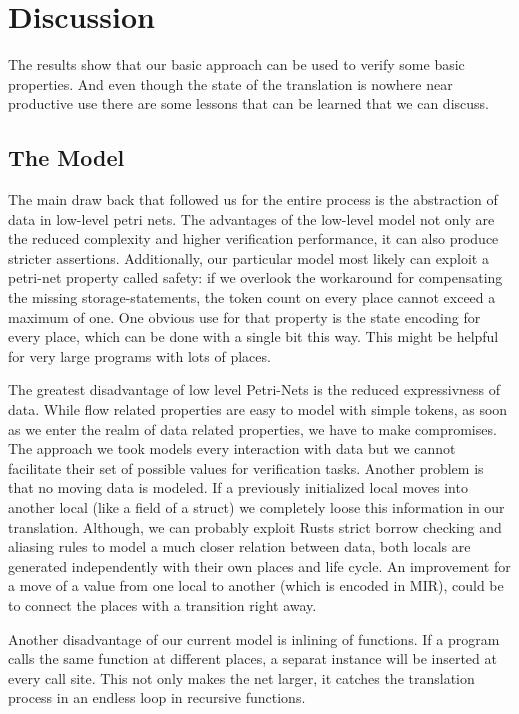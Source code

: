 \section{Discussion}
The results show that our basic approach can be used to verify some basic properties.
And even though the state of the translation is nowhere near productive use there are some lessons that can be learned that we can discuss.
\subsection{The Model}
The main draw back that followed us for the entire process is the abstraction of data in low-level petri nets.
The advantages of the low-level model not only are the reduced complexity and higher verification performance, it can also produce stricter assertions.
Additionally, our particular model most likely can exploit a petri-net property called safety:
if we overlook the workaround for compensating the missing storage-statements, the token count on every place cannot exceed a maximum of one.
One obvious use for that property is the state encoding for every place, which can be done with a single bit this way.
This might be helpful for very large programs with lots of places.

The greatest disadvantage of low level Petri-Nets is the reduced expressivness of data.
While flow related properties are easy to model with simple tokens, as soon as we enter the realm of data related properties, we have to make compromises.
The approach we took models every interaction with data but we cannot facilitate their set of possible values for verification tasks.
Another problem is that no moving data is modeled.
If a previously initialized local moves into another local (like a field of a struct) we completely loose this information in our translation.
Although, we can probably exploit Rusts strict borrow checking and aliasing rules to model a much closer relation between data,
both locals are generated independently with their own places and life cycle.
An improvement for a move of a value from one local to another (which is encoded in MIR), could be to connect the places with a transition right away.

Another disadvantage of our current model is inlining of functions.
If a program calls the same function at different places, a separat instance will be inserted at every call site.
This not only makes the net larger, it catches the translation process in an endless loop in recursive functions.

